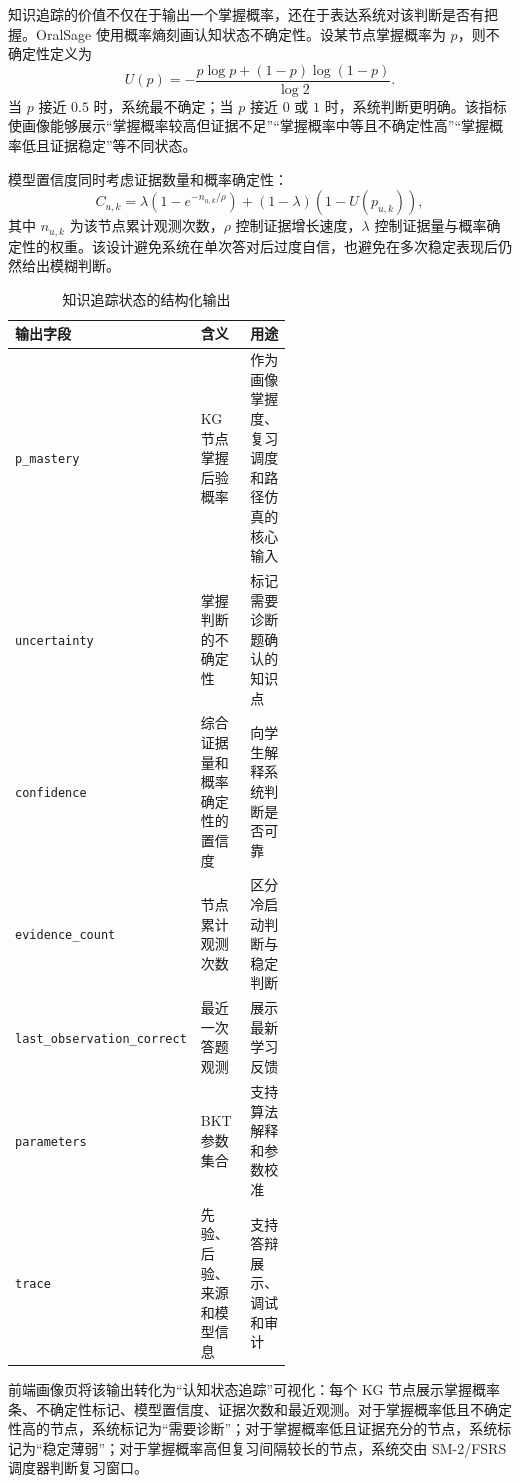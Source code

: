 知识追踪的价值不仅在于输出一个掌握概率，还在于表达系统对该判断是否有把握。OralSage 使用概率熵刻画认知状态不确定性。设某节点掌握概率为 $p$，则不确定性定义为
\begin{equation}
  U(p)=
  -\frac{p\log p+(1-p)\log(1-p)}{\log 2}.
  \label{eq:kt-uncertainty}
\end{equation}
当 $p$ 接近 $0.5$ 时，系统最不确定；当 $p$ 接近 $0$ 或 $1$ 时，系统判断更明确。该指标使画像能够展示“掌握概率较高但证据不足”“掌握概率中等且不确定性高”“掌握概率低且证据稳定”等不同状态。

模型置信度同时考虑证据数量和概率确定性：
\begin{equation}
  C_{u,k}=
  \lambda
  \left(1-e^{-n_{u,k}/\rho}\right)
  +(1-\lambda)(1-U(p_{u,k})),
  \label{eq:kt-confidence}
\end{equation}
其中 $n_{u,k}$ 为该节点累计观测次数，$\rho$ 控制证据增长速度，$\lambda$ 控制证据量与概率确定性的权重。该设计避免系统在单次答对后过度自信，也避免在多次稳定表现后仍然给出模糊判断。

\begin{table}[H]
  \centering
  \caption{知识追踪状态的结构化输出}
  \label{tab:kt-output-fields}
  \begin{tabularx}{\linewidth}{p{0.28\linewidth}p{0.27\linewidth}X}
    \toprule
    输出字段 & 含义 & 用途 \\
    \midrule
    \texttt{p\_mastery} & KG 节点掌握后验概率 & 作为画像掌握度、复习调度和路径仿真的核心输入 \\
    \texttt{uncertainty} & 掌握判断的不确定性 & 标记需要诊断题确认的知识点 \\
    \texttt{confidence} & 综合证据量和概率确定性的置信度 & 向学生解释系统判断是否可靠 \\
    \texttt{evidence\_count} & 节点累计观测次数 & 区分冷启动判断与稳定判断 \\
    \texttt{last\_observation\_correct} & 最近一次答题观测 & 展示最新学习反馈 \\
    \texttt{parameters} & BKT 参数集合 & 支持算法解释和参数校准 \\
    \texttt{trace} & 先验、后验、来源和模型信息 & 支持答辩展示、调试和审计 \\
    \bottomrule
  \end{tabularx}
\end{table}

前端画像页将该输出转化为“认知状态追踪”可视化：每个 KG 节点展示掌握概率条、不确定性标记、模型置信度、证据次数和最近观测。对于掌握概率低且不确定性高的节点，系统标记为“需要诊断”；对于掌握概率低且证据充分的节点，系统标记为“稳定薄弱”；对于掌握概率高但复习间隔较长的节点，系统交由 SM-2/FSRS 调度器判断复习窗口。

